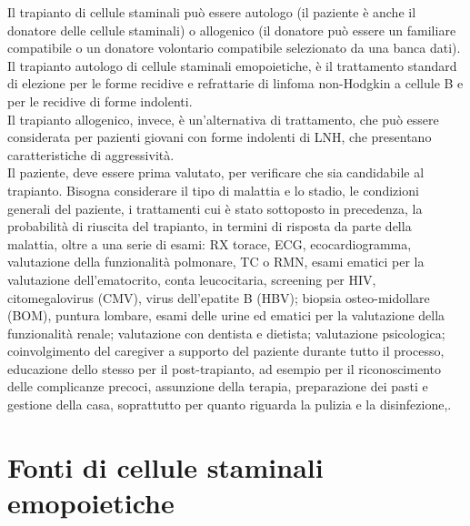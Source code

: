 Il trapianto di cellule staminali può essere autologo (il paziente è anche il donatore delle cellule staminali) 
o allogenico (il donatore può essere un familiare compatibile o un donatore volontario compatibile selezionato da una 
banca dati)\cite{LLS}.\\
Il trapianto autologo di cellule staminali emopoietiche, è il trattamento standard di elezione per le forme recidive e 
refrattarie di linfoma non-Hodgkin a cellule B\cite{TRANS} e per le recidive di forme indolenti.\\ 
Il trapianto allogenico, invece, è un’alternativa di trattamento, che può essere considerata per pazienti giovani con forme 
indolenti di LNH, che presentano caratteristiche di aggressività\cite{LLS}.\\
Il paziente, deve essere prima valutato, per verificare che sia candidabile al trapianto. 
Bisogna considerare il tipo di malattia e lo stadio, le condizioni generali del paziente, i trattamenti cui è stato 
sottoposto in precedenza, la probabilità di riuscita del trapianto, in termini di risposta da parte della malattia, 
oltre a una serie di esami: RX torace, ECG, ecocardiogramma, valutazione della funzionalità polmonare, TC o RMN, 
esami ematici per la valutazione dell’ematocrito, conta leucocitaria, screening per HIV, citomegalovirus (CMV), 
virus dell’epatite B (HBV); biopsia osteo-midollare (BOM), puntura lombare, esami delle urine ed ematici per la 
valutazione della funzionalità renale; valutazione con dentista e dietista; valutazione psicologica; 
coinvolgimento del caregiver a supporto del paziente durante tutto il processo, educazione dello stesso per il 
post-trapianto, ad esempio per il riconoscimento delle complicanze precoci, assunzione della terapia, preparazione 
dei pasti e gestione della casa, soprattutto per quanto riguarda la pulizia e la disinfezione\cite{LLS},\cite{STEMCELLS}.

\section{Fonti di cellule staminali emopoietiche}

